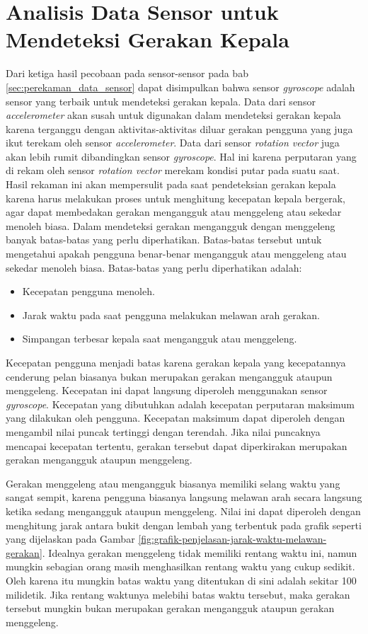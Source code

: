 \section{Analisis Data Sensor untuk Mendeteksi Gerakan Kepala}

Dari ketiga hasil pecobaan pada sensor-sensor pada bab \ref{sec:perekaman_data_sensor} dapat disimpulkan bahwa sensor \textit{gyroscope} adalah sensor yang terbaik untuk mendeteksi gerakan kepala. Data dari sensor \textit{accelerometer} akan susah untuk digunakan dalam mendeteksi gerakan kepala karena terganggu dengan aktivitas-aktivitas diluar gerakan pengguna yang juga ikut terekam oleh sensor \textit{accelerometer}. Data dari sensor \textit{rotation vector} juga akan lebih rumit dibandingkan sensor \textit{gyroscope}. Hal ini karena perputaran yang di rekam oleh sensor \textit{rotation vector} merekam kondisi putar pada suatu saat. Hasil rekaman ini akan mempersulit pada saat pendeteksian gerakan kepala karena harus melakukan proses untuk menghitung kecepatan kepala bergerak, agar dapat membedakan gerakan mengangguk atau menggeleng atau sekedar menoleh biasa. 
Dalam mendeteksi gerakan mengangguk dengan menggeleng banyak batas-batas yang perlu diperhatikan. Batas-batas tersebut untuk mengetahui apakah pengguna benar-benar mengangguk atau menggeleng atau sekedar menoleh biasa. Batas-batas yang perlu diperhatikan adalah:

\begin{itemize}
	\item Kecepatan pengguna menoleh.
	\item Jarak waktu pada saat pengguna melakukan melawan arah gerakan.
	\item Simpangan terbesar kepala saat mengangguk atau menggeleng.
\end{itemize}

Kecepatan pengguna menjadi batas karena gerakan kepala yang kecepatannya cenderung pelan biasanya bukan merupakan gerakan mengangguk ataupun menggeleng. Kecepatan ini dapat langsung diperoleh menggunakan sensor \textit{gyroscope}. Kecepatan yang dibutuhkan adalah kecepatan perputaran maksimum yang dilakukan oleh pengguna. Kecepatan maksimum dapat diperoleh dengan mengambil nilai puncak tertinggi dengan terendah. Jika nilai puncaknya mencapai kecepatan tertentu, gerakan tersebut dapat diperkirakan merupakan gerakan mengangguk ataupun menggeleng.

Gerakan menggeleng atau mengangguk biasanya memiliki selang waktu yang sangat sempit, karena pengguna biasanya langsung melawan arah secara langsung ketika sedang mengangguk ataupun menggeleng. Nilai ini dapat diperoleh dengan menghitung jarak antara bukit dengan lembah yang terbentuk pada grafik seperti yang dijelaskan pada Gambar \ref{fig:grafik-penjelasan-jarak-waktu-melawan-gerakan}. Idealnya gerakan menggeleng tidak memiliki rentang waktu ini, namun mungkin sebagian orang masih menghasilkan rentang waktu yang cukup sedikit. Oleh karena itu mungkin batas waktu yang ditentukan di sini adalah sekitar 100 milidetik. Jika rentang waktunya melebihi batas waktu tersebut, maka gerakan tersebut mungkin bukan merupakan gerakan mengangguk ataupun gerakan menggeleng. 

